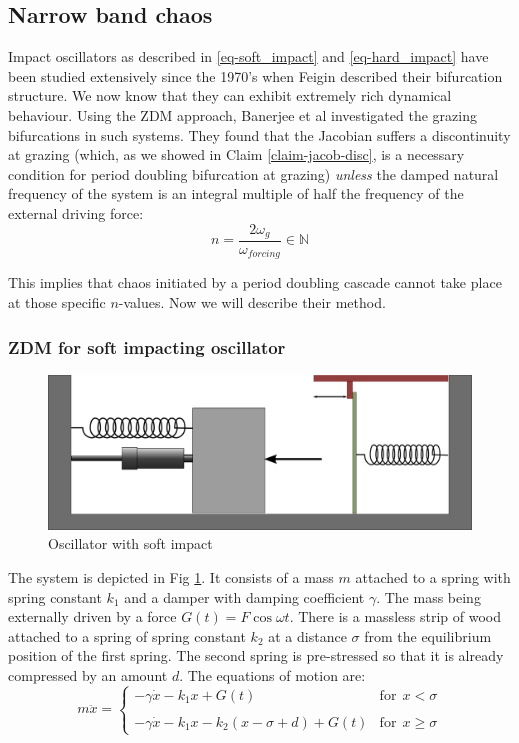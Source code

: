 \documentclass{book}
\renewcommand{\(}{\begin{columns}}
\renewcommand{\)}{\end{columns}}
\newcommand{\<}[1]{\begin{column}{#1}}
\renewcommand{\>}{\end{column}}
\begin{document}
\subsection{Narrow band chaos}
Impact oscillators as described in \eqref{eq-soft_impact} and 
\eqref{eq-hard_impact} have been studied extensively since the 1970's when 
Feigin \cite{feigin-1970} described their bifurcation structure.  We now know 
that they can exhibit extremely rich dynamical behaviour.  
Using the ZDM approach, Banerjee et al \cite{banerjee-kundu-soft} investigated 
the grazing bifurcations in such systems.  They found that the Jacobian 
suffers a discontinuity at grazing (which, as we showed in 
Claim \ref{claim-jacob-disc}, is a necessary condition for period doubling 
bifurcation at grazing) \emph{unless} the damped natural frequency of the system 
is an integral multiple of half the frequency of the external driving force:
\begin{equation}
\label{cond-chaos-vanish}
n=\frac{2\omega_g}{\omega_{forcing}}\in \mathbb{N}
\end{equation}

This implies that chaos initiated by a period doubling cascade cannot take 
place at those specific $n$-values.  Now we will describe their method.  

\subsubsection{ZDM for soft impacting oscillator}
\label{subsec-ZDM}

\begin{figure}[!htb]
\caption{Oscillator with soft impact}
\label{fig-soft-impact}
\begin{center}
\includegraphics[width=0.5\columnwidth]{soft-prest}
\end{center}
\end{figure}

The system is depicted in Fig \ref{fig-soft-impact}. It consists of a 
mass $m$ attached to a spring with spring constant $k_1$ and a damper with 
damping coefficient $\gamma$. The mass being externally driven by a force 
$G(t)=F\cos{\omega t}$.  There is a massless strip of wood attached to a 
spring of spring constant $k_2$ at a distance $\sigma$ from the equilibrium 
position of the first spring.  The second spring is pre-stressed so that it
 is already compressed by an amount $d$.  The equations of motion are:
\begin{equation}
m\ddot{x}=
\begin{cases} 
-\gamma \dot{x}-k_1x+G(t)&\mathrm{for}~~x<\sigma
\\ \\ 
-\gamma \dot{x}-k_1x-k_2(x-\sigma+d)+G(t)&\mathrm{for}~~x\geq\sigma 
\end{cases}
\end{equation}
\end{document}
